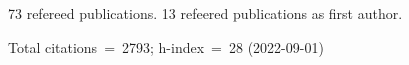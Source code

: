 73 refereed publications. 13 refeered publications as first author.

Total citations~=~2793; h-index~=~28 (2022-09-01)